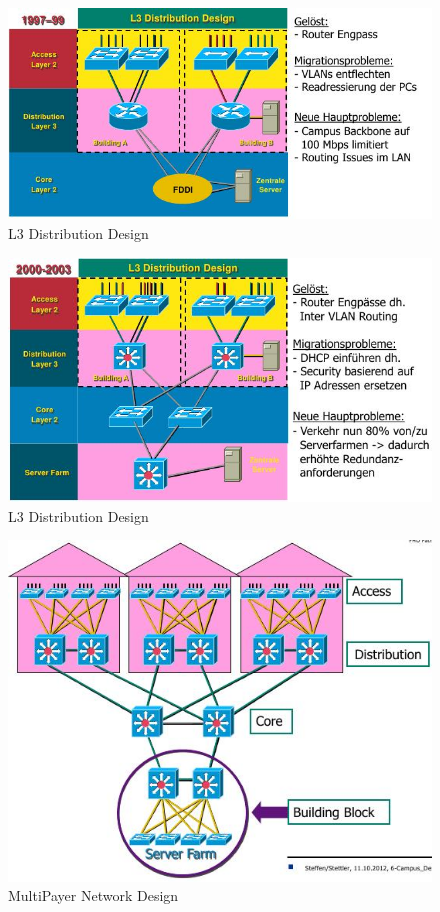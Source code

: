 \documentclass[ngerman,a4paper,12pt]{scrreprt}
\begin{document}
\begin{figure}[H]
	\centering
	 \includegraphics[width=\textwidth]{img/V5.12.jpg}
	\caption{L3 Distribution Design}
	\label{}
\end{figure}
\begin{figure}[H]
	\centering
	 \includegraphics[width=\textwidth]{img/V5.13.jpg}
	\caption{L3 Distribution Design}
	\label{}
\end{figure}

\begin{figure}[H]
	\centering
	 \includegraphics[width=\textwidth]{img/V5.14.jpg}
	\caption{MultiPayer Network Design}
	\label{}
\end{figure}
\end{document}
